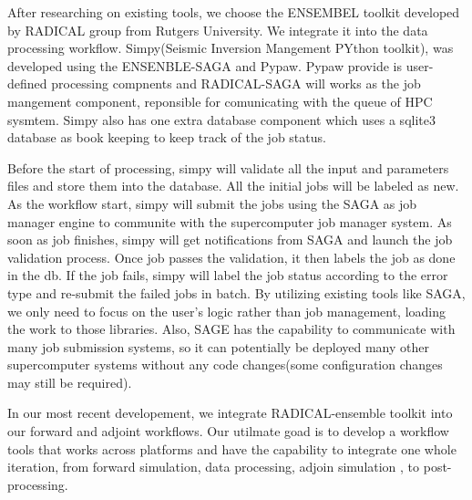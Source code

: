 After researching on existing tools, we choose the ENSEMBEL toolkit developed by RADICAL
group from Rutgers University. We integrate it into the data processing workflow.
Simpy(Seismic Inversion Mangement PYthon toolkit), was developed using the ENSENBLE-SAGA
and Pypaw. Pypaw provide is user-defined processing compnents and RADICAL-SAGA will works as the 
job mangement component, reponsible for comunicating with the queue of HPC sysmtem.
Simpy also has one extra database component which uses a sqlite3 database
as book keeping to keep track of the job status.

Before the start of processing,
simpy will validate all the input and parameters files and store them
into the database. All the initial jobs will be labeled as new.
As the workflow start, simpy will submit the jobs using the 
SAGA as job manager engine to communite with the supercomputer job manager system.
As soon as job finishes, simpy will get notifications from
SAGA and launch the job validation process. Once job passes the validation,
it then labels the job as done in the db. If the job fails, simpy will label
the job status according to the error type and re-submit the failed jobs in batch.
By utilizing existing tools like SAGA, we only need to focus on the user's logic rather
than job management, loading the work to those libraries.
Also, SAGE has the capability to communicate with many job submission systems,
so it can potentially be deployed many other supercomputer systems without any
code changes(some configuration changes may still be required).

In our most recent developement, we integrate RADICAL-ensemble toolkit
into our forward and adjoint workflows. Our utilmate
goad is to develop a workflow tools that works across platforms and have the capability to
integrate one whole iteration, from forward simulation, data processing, adjoin simulation
, to post-processing.
